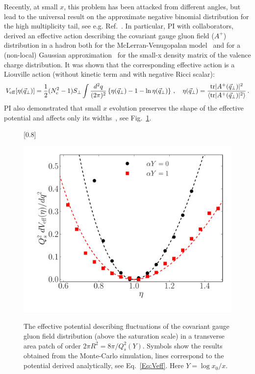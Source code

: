 Recently, at small $x$, this problem has been attacked from different angles, 
but lead to the universal result on the approximate negative binomial 
distribution for the high multiplicity tail, see e.g. Ref.~\cite{Liou:2016mfr,Kovner:2018azs}.  
In particular, PI with collaborators, derived an effective action describing 
the covariant gauge gluon field ($A^+$)  distribution in a hadron both for the McLerran-Venugopalan 
model~\cite{McLerran:1993ni,McLerran:1993ka} and for a (non-local) Gaussian 
approximation~\cite{Iancu:2002tr} 
for the small-x density matrix of 
the valence charge distribution. It was shown that the corresponding effective action is a Liouville action (without kinetic term and with negative Ricci scalar):
\begin{equation}
	\label{Eq:Veff}
	V_{\rm eff} [\eta( \vec {q}_\perp )] = \frac{1}{2} (N_c^2-1) S_\perp \int \frac{d^2q}{(2\pi)^2} 
	\left\{ \eta( \vec {q}_\perp ) -1 - \ln \eta ( \vec {q}_\perp ) \right\}\,, \quad  \eta( \vec {q}_\perp )   =
	\frac{
		 {\rm tr} |A^+( \vec {q}_\perp )|^2} 
		{  \langle  {\rm tr} |A^+( \vec {q}_\perp )|^2 \rangle    }\,. 
\end{equation}
PI also demonstrated that small $x$  evolution preserves the shape of the effective 
potential and affects only its widths~\cite{Dumitru:2017cwt}, see Fig.~\ref{fig:veff}. 


\begin{figure}[t]
[0.8\linewidth]
{
\caption{
  The effective potential describing fluctuations of the
  covariant gauge gluon field distribution (above the saturation scale) in
  a transverse area patch of order $2\pi R^2 = 8\pi/Q_s^2(Y)$. Symbols
  show the results obtained from the Monte-Carlo simulation, lines correspond
  to the potential derived analytically, see Eq.~\eqref{Eq:Veff}. Here  $Y=\log x_0/x$. 
	}
	\label{fig:veff}
}
{ \includegraphics[width=\linewidth]{./figures/veff.pdf}
 }
\end{figure} 



